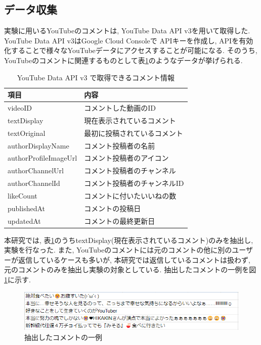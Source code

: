 \documentclass{ltjarticle}
\begin{document}
\subsection{データ収集}
実験に用いるYouTubeのコメントは, YouTube Data API v3を用いて取得した. YouTube Data API v3はGoogle Cloud Consoleで
APIキーを作成し, APIを有効化することで様々なYouTubeデータにアクセスすることが可能になる. 
そのうち, YouTubeのコメントに関連するものとして表\ref{table:データ収集}のようなデータが挙げられる. 
\begin{table}[h]
    \caption{YouTube Data API v3 で取得できるコメント情報}
    \vspace{5truept}

    \centering
    \begin{tabular}{ll}
        \hline
        項目 & 内容 \\
        \hline\hline
        videoID & コメントした動画のID\\
        textDisplay & 現在表示されているコメント\\
        textOriginal & 最初に投稿されているコメント\\
        authorDisplayName & コメント投稿者の名前\\
        authorProfileImageUrl & コメント投稿者のアイコン\\
        authorChannelUrl & コメント投稿者のチャンネル\\
        authorChannelId & コメント投稿者のチャンネルID\\
        likeCount & コメントに付いたいいねの数\\
        publishedAt & コメントの投稿日\\
        updatedAt & コメントの最終更新日\\
        \hline
    \end{tabular}
    \label{table:データ収集}
\end{table}

本研究では, 表\ref{table:データ収集}のうちtextDisplay(現在表示されているコメント)のみを抽出し, 実験を行なった. 
また, YouTubeのコメントには元のコメントの他に別のユーザーが返信しているケースも多いが, 本研究では返信しているコメントは扱わず, 
元のコメントのみを抽出し実験の対象としている. 抽出したコメントの一例を図\ref{fig:元コメント}に示す. 
\vspace{10truept}

\begin{figure}[h]
    \centering
    \includegraphics[width=14.5cm]{images/元コメント.png}
    \caption{抽出したコメントの一例}
    \label{fig:元コメント}
\end{figure}
\newpage
\end{document}
